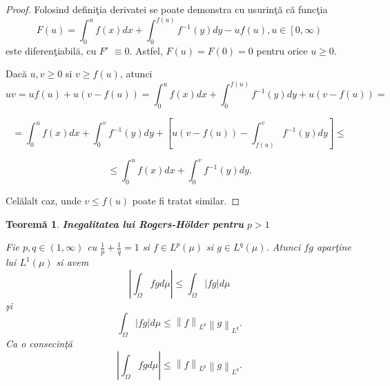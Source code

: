 \documentclass[a4paper,12pt,oneside]{report}
\newtheorem{theorem}{Teorem\u a}
\begin{document}
\begin{proof}
Folosind defini\c{t}ia derivatei se poate demonstra cu usurin\c{t}\u{a} c\u{a} func\c{t}ia
\begin{displaymath}
  F\left ( u \right )= \int_{0}^{u}f\left ( x \right )dx + \int_{0}^{f\left ( u \right )}f^{-1}\left ( y \right )dy -uf\left ( u \right ), u \in \left [ 0,\infty  \right )
\end{displaymath}
este diferen\c{t}iabil\u{a}, cu \({F}'\) $\equiv 0.$ Astfel, \(F\left ( u \right )= F\left ( 0 \right )= 0\) pentru orice \(u\geq 0\).
	
Dac\u{a} \(u, v \geq 0\)  si \(v\geq f\left ( u \right )\), atunci
\begin{displaymath}
  uv = uf\left ( u \right )+ u\left ( v- f\left ( u \right ) \right )=  \int_{0}^{u}f\left ( x \right )dx + \int_{0}^{f\left ( u \right )}f^{-1}\left ( y \right )dy + u\left ( v - f\left ( u \right ) \right ) =
\end{displaymath}

\begin{displaymath}
  = \int_{0}^{u}f\left ( x \right )dx + \int_{0}^{v}f^{-1}\left ( y \right )dy + \left [ u\left ( v-f\left ( u \right )  \right ) - \int_{f\left ( u \right )}^{v}f^{-1}\left ( y \right )dy\right ]\leq
\end{displaymath}

\begin{displaymath}
  \leq \int_{0}^{u}f\left ( x \right )dx + \int_{0}^{v}f^{-1}\left ( y \right )dy.
\end{displaymath}



	Cel\u{a}lalt caz, unde \(v\leq f\left ( u \right )\) poate fi tratat similar.
\end{proof}

\begin{theorem}

\textbf{Inegalitatea lui Rogers-Hölder pentru} \(p > 1\)

Fie \(p,q \in \left ( 1, \infty  \right )\) cu \(\frac{1}{p} + \frac{1}{q} = 1\) si  \(f\in L^{p}\left ( \mu  \right )\) si \(g\in L^{q}\left ( \mu  \right )\). Atunci \(fg\) apar\c{t}ine lui \(L^{1}\left ( \mu  \right )\) si avem
\begin{displaymath}
  \left | \int_{\Omega}^{} fg  d\mu \right |\leq \int_{\Omega}^{}\left | fg \right |d\mu \label{eq:1.6} \tag{1.6}
\end{displaymath}
\c{s}i
\begin{displaymath}
  \int_{\Omega}^{}\left | fg \right |d\mu \leq \left \| f \right \|_{L^{p}}\left \| g \right \|_{{L}^{q}}. \label{eq:1.7} \tag{1.7}
\end{displaymath}
Ca o consecin\c{t}\u{a}
\begin{displaymath}
  \left | \int_{\Omega}^{} fg  d\mu \right |\leq \left \| f \right \|_{L^{p}}\left \| g \right \|_{{L}^{q}}. \label{eq:1.8} \tag{1.8}
\end{displaymath}
\end{theorem}
\end{document}
